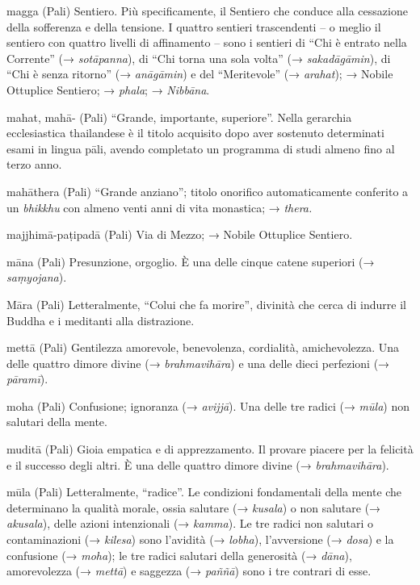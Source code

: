 \begin{glossarydescription}

\item[magga] (Pali) Sentiero. Più specificamente, il Sentiero che conduce alla
cessazione della sofferenza e della tensione. I quattro sentieri
trascendenti -- o meglio il sentiero con quattro livelli di affinamento
-- sono i sentieri di ``Chi è entrato nella Corrente'' (→
\emph{sotāpanna}), di ``Chi torna una sola volta'' (→
\emph{sakadāgāmin}), di ``Chi è senza ritorno'' (→ \emph{anāgāmin}) e
del ``Meritevole'' (→ \emph{arahat}); → Nobile Ottuplice Sentiero; →
\emph{phala}; → \emph{Nibbāna}.

\item[mahat, mahā-] (Pali) ``Grande, importante, superiore''. Nella
gerarchia ecclesiastica thailandese è il titolo acquisito dopo aver
sostenuto determinati esami in lingua pāli, avendo completato un
programma di studi almeno fino al terzo anno.

\item[mahāthera] (Pali) ``Grande anziano''; titolo onorifico automaticamente
conferito a un \emph{bhikkhu} con almeno venti anni di vita monastica; →
\emph{thera.}

\item[majjhimā-paṭipadā] (Pali) Via di Mezzo; → Nobile Ottuplice
Sentiero.

\item[māna] (Pali) Presunzione, orgoglio. È una delle cinque catene superiori
(→ \emph{saṃyojana}).

\item[Māra] (Pali) Letteralmente, ``Colui che fa morire'', divinità che cerca di
indurre il Buddha e i meditanti alla distrazione.

\item[mettā] (Pali) Gentilezza amorevole, benevolenza, cordialità,
amichevolezza. Una delle quattro dimore divine (→ \emph{brahmavihāra}) e
una delle dieci perfezioni (→ \emph{pāramī}).

\item[moha] (Pali) Confusione; ignoranza (→ \emph{avijjā}). Una delle tre
radici (→ \emph{mūla}) non salutari della mente.

\item[muditā] (Pali) Gioia empatica e di apprezzamento. Il provare piacere per
la felicità e il successo degli altri. È una delle quattro dimore divine
(→ \emph{brahmavihāra}).

\item[mūla] (Pali) Letteralmente, ``radice''. Le condizioni fondamentali della
mente che determinano la qualità morale, ossia salutare (→
\emph{kusala}) o non salutare (→ \emph{akusala}), delle azioni
intenzionali (→ \emph{kamma}). Le tre radici non salutari o
contaminazioni (→ \emph{kilesa}) sono l'avidità (→ \emph{lobha}),
l'avversione (→ \emph{dosa}) e la confusione (→ \emph{moha}); le tre
radici salutari della generosità (→ \emph{dāna}), amorevolezza (→
\emph{mettā}) e saggezza (→ \emph{paññā}) sono i tre contrari di esse.


\end{glossarydescription}
